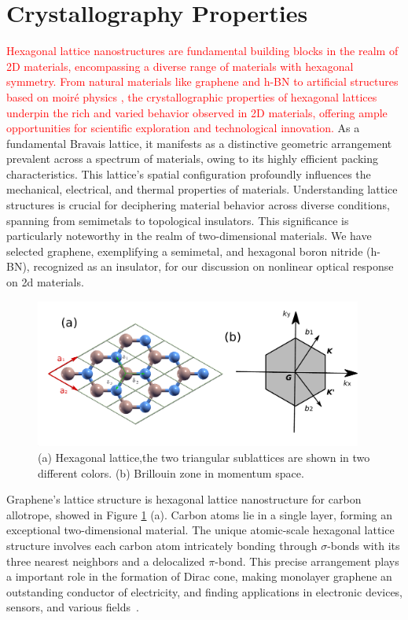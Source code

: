 \section{Crystallography Properties}
\textcolor{red}{Hexagonal lattice nanostructures are fundamental building blocks in the realm of 2D materials, encompassing a diverse range of materials with hexagonal symmetry. From natural materials like graphene and \gls{h-BN} to artificial structures based on moiré physics \cite{kennes2021moire}, the crystallographic properties of hexagonal lattices underpin the rich and varied behavior observed in 2D materials, offering ample opportunities for scientific exploration and technological innovation.}
As a fundamental Bravais lattice, it manifests as a distinctive geometric arrangement prevalent across a spectrum of materials, owing to its highly efficient packing characteristics. This lattice's spatial configuration profoundly influences the mechanical, electrical, and thermal properties of materials. Understanding lattice structures is crucial for deciphering material behavior across diverse conditions, spanning from semimetals to topological insulators. This significance is particularly noteworthy in the realm of two-dimensional materials. We have selected graphene, exemplifying a semimetal, and hexagonal boron nitride (h-BN), recognized as an insulator, for our discussion on nonlinear optical response on 2d materials.\\
\begin{figure}[htpb]
	\centering
	\includegraphics[width=0.96\textwidth]{pic/lattice.pdf}
	\caption[Lab coordinate system]{(a) Hexagonal lattice,the two triangular sublattices are shown
		in two different colors. (b) Brillouin zone in momentum space.}
	\label{fig: lattice}
\end{figure}
Graphene's lattice structure is hexagonal lattice nanostructure for carbon allotrope, showed in Figure \ref{fig: lattice} (a). Carbon atoms
lie in a single layer, forming an exceptional two-dimensional material. The unique
atomic-scale hexagonal lattice structure involves each carbon atom intricately bonding through
$\sigma$-bonds with its three nearest neighbors and a delocalized $\pi$-bond. This precise
arrangement plays a important role in the formation of Dirac cone, making monolayer graphene an outstanding conductor of electricity, and
finding applications in electronic devices, sensors, and various fields~\cite{sarma2011electronic}.

